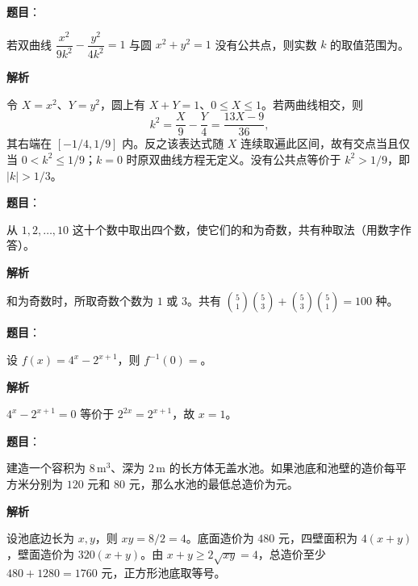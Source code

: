 \begin{answer}

\textbf{题目}：

若双曲线 $\dfrac{x^2}{9k^2}-\dfrac{y^2}{4k^2}=1$ 与圆 $x^2+y^2=1$ 没有公共点，则实数 $k$ 的取值范围为\underline{\qquad\qquad}。

\textbf{解析}

令 $X=x^2$、$Y=y^2$，圆上有 $X+Y=1$、$0\le X\le1$。若两曲线相交，则
\nopagebreak[4]
\[
k^2=\frac X9-\frac Y4=\frac{13X-9}{36},
\]
其右端在 $[-1/4,1/9]$ 内。反之该表达式随 $X$ 连续取遍此区间，故有交点当且仅当 $0<k^2\le1/9$；$k=0$ 时原双曲线方程无定义。没有公共点等价于 $k^2>1/9$，即 $|k|>1/3$。


\end{answer}
\begin{answer}

\textbf{题目}：

从 $1,2,\ldots,10$ 这十个数中取出四个数，使它们的和为奇数，共有\underline{\qquad\qquad}种取法（用数字作答）。

\textbf{解析}

和为奇数时，所取奇数个数为 $1$ 或 $3$。共有
$\binom51\binom53+\binom53\binom51=100$ 种。


\end{answer}
\begin{answer}

\textbf{题目}：

设 $f(x)=4^x-2^{x+1}$，则 $f^{-1}(0)=$\underline{\qquad\qquad}。

\textbf{解析}

$4^x-2^{x+1}=0$ 等价于 $2^{2x}=2^{x+1}$，故 $x=1$。


\end{answer}
\begin{answer}

\textbf{题目}：

建造一个容积为 $8\,\mathrm{m}^3$、深为 $2\,\mathrm m$ 的长方体无盖水池。如果池底和池壁的造价每平方米分别为 $120$ 元和 $80$ 元，那么水池的最低总造价为\underline{\qquad\qquad}元。

\textbf{解析}

设池底边长为 $x,y$，则 $xy=8/2=4$。底面造价为 $480$ 元，四壁面积为 $4(x+y)$，壁面造价为 $320(x+y)$。由 $x+y\ge2\sqrt{xy}=4$，总造价至少 $480+1280=1760$ 元，正方形池底取等号。


\end{answer}
